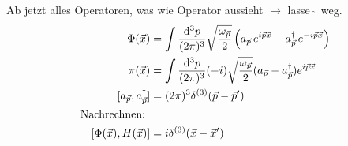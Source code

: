 	Ab jetzt alles Operatoren, was wie Operator aussieht $\rightarrow$ lasse \,$\hat{}$\, weg.
		\begin{align*}
			\Phi(\vec{x}) &= \int \frac{\mathrm{d}^3 p}{(2\pi)^3} 
			\sqrt{\frac{\omega_{\vec{p}}}{2}} \left(
				a_{\vec{p}}\, e^{i \vec{p} \vec{x}} -
				a^\dagger_{\vec{p}} \,e^{- i \vec{p} \vec{x}}
			\right) \\
			\pi (\vec{x}) &= \int \frac{\mathrm{d}^3 p}{(2 \pi)^3} (-i) \sqrt{\frac{\omega_{\vec{p}}}{2}} (a_{\vec{p}} - a_{\vec{p}}^\dagger)
			e^{i \vec{p}\vec{x}} \\
			[a_{\vec{p}}, a_{\vec{p}}^\dagger] &= (2\pi)^3 \delta^{(3)}(\vec{p}- \vec{p}') \\
			\text{Nachrechnen: } \\ [\Phi(\vec{x}), H(\vec{x})] &= i \delta^{(3)}(\vec{x}- \vec{x}')
		\end{align*}